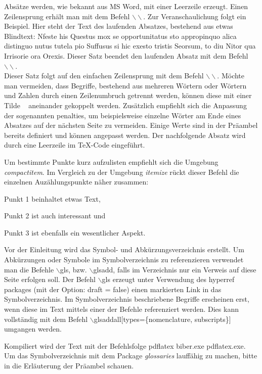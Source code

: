 Absätze werden, wie bekannt aus MS Word, mit einer Leerzeile erzeugt. Einen Zeilensprung erhält man mit dem Befehl $\backslash\backslash$. Zur Veranschaulichung folgt ein Beispiel. Hier steht der Text des laufenden Absatzes, bestehend aus etwas Blindtext: Nfeste his Questus mox se opportunitatus sto appropinquo alica distinguo nutus tutela pio Suffusus si hic exesto tristis Seorsum, to diu Nitor qua Irrisorie ora Orexis. Dieser Satz beendet den laufenden Absatz mit dem Befehl $\backslash\backslash$.\\
Dieser Satz folgt auf den einfachen Zeilensprung mit dem Befehl $\backslash\backslash$. Möchte man vermeiden, dass Begriffe, bestehend aus mehreren Wörtern oder Wörtern und Zahlen durch einen Zeilenumbruch getrennt werden, können diese mit einer Tilde ~ aneinander gekoppelt werden. Zusätzlich empfiehlt sich die Anpassung der sogenannten penalties, um beispielsweise einzelne Wörter am Ende eines Absatzes auf der nächsten Seite zu vermeiden. Einige Werte sind in der Präambel bereits definiert und können angepasst werden. Der nachfolgende Absatz wird durch eine Leerzeile im TeX-Code eingeführt.

Um bestimmte Punkte kurz aufzulisten empfiehlt sich die Umgebung \emph{compactitem}. Im Vergleich zu der Umgebung \emph{itemize} rückt dieser Befehl die einzelnen Auzählungspunkte näher zusammen:
\begin{compactitem}
\item Punkt 1 beinhaltet etwas Text,
\item Punkt 2 ist auch interessant und
\item Punkt 3 ist ebenfalls ein wesentlicher Aspekt.
\end{compactitem}

Vor der Einleitung wird das Symbol- und Abkürzungsverzeichnis erstellt. Um Abkürzungen oder Symbole im Symbolverzeichnis zu referenzieren verwendet man die Befehle $\backslash$gls, bzw. $\backslash$glsadd, falls im Verzeichnis nur ein Verweis auf diese Seite erfolgen soll. Der Befehl $\backslash$gls erzeugt unter Verwendung des hyperref packages (mit der Option: draft = false) einen markierten Link in das Symbolverzeichnis. Im Symbolverzeichnis beschriebene Begriffe erscheinen erst, wenn diese im Text mittels einer der Befehle referenziert werden. Dies kann vollständig mit dem Befehl $\backslash$glsaddall[types=\{nomenclature, subscripts\}] umgangen werden.   \glsaddall[types={subscripts,notation}] %

Kompiliert wird der Text mit der Befehlsfolge pdflatex biber.exe pdflatex.exe. Um das Symbolverzeichnis mit dem Package \emph{glossaries} lauffähig zu machen, bitte in die Erläuterung der Präambel schauen.
